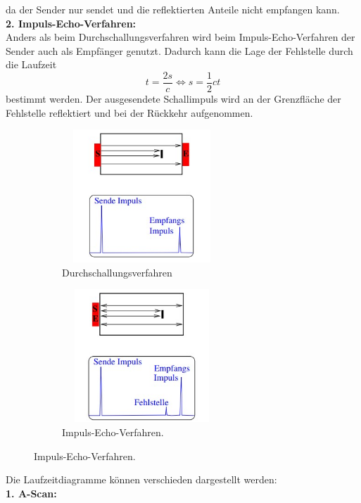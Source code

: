 da der Sender nur sendet und die reflektierten Anteile nicht empfangen kann.\\
\textbf{2. Impuls-Echo-Verfahren:}\\
Anders als beim Durchschallungsverfahren wird beim Impuls-Echo-Verfahren der Sender auch als Empfänger genutzt.
Dadurch kann die Lage der Fehlstelle durch die Laufzeit
\begin{equation*}
    t = \frac{2s}{c} \Leftrightarrow s = \frac{1}{2}ct
\end{equation*}
bestimmt werden. Der ausgesendete Schallimpuls wird an der Grenzfläche der Fehlstelle reflektiert und bei der 
Rückkehr aufgenommen.
\begin{figure}[H]
    \centering
    \begin{subfigure}[b]{0.49\textwidth}
        \centering
        \includegraphics[width=6cm, height=5cm]{img/durchschallung.jpg}
        \caption[]
        {{\small Durchschallungsverfahren}}    
        \label{fig:durchschallung}
    \end{subfigure}
    \hfill
    \begin{subfigure}[b]{0.49\textwidth}  
        \centering 
        \includegraphics[width=6cm, height=5cm]{img/impulsecho.jpg}
        \caption[]
        {{\small Impuls-Echo-Verfahren.}}    
        \label{fig:impulsecho}
    \end{subfigure}
\end{figure}
Die Laufzeitdiagramme können verschieden dargestellt werden:\\
\textbf{1. A-Scan:}\\
